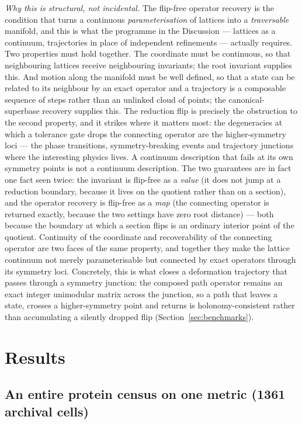 \documentclass[11pt]{article}
\begin{document}
\emph{Why this is structural, not incidental.} The flip-free operator recovery is
the condition that turns a continuous \emph{parameterisation} of lattices into a
\emph{traversable} manifold, and this is what the programme in the Discussion ---
lattices as a continuum, trajectories in place of independent refinements ---
actually requires. Two properties must hold together. The coordinate must be
continuous, so that neighbouring lattices receive neighbouring invariants; the
root invariant supplies this. And motion along the manifold must be well defined,
so that a state can be related to its neighbour by an exact operator and a
trajectory is a composable sequence of steps rather than an unlinked cloud of
points; the canonical-superbase recovery supplies this. The reduction flip is
precisely the obstruction to the second property, and it strikes where it matters
most: the degeneracies at which a tolerance gate drops the connecting operator are
the higher-symmetry loci --- the phase transitions, symmetry-breaking events and
trajectory junctions where the interesting physics lives. A continuum description
that fails at its own symmetry points is not a continuum description. The two
guarantees are in fact one fact seen twice: the invariant is flip-free as a
\emph{value} (it does not jump at a reduction boundary, because it lives on the
quotient rather than on a section), and the operator recovery is flip-free as a
\emph{map} (the connecting operator is returned exactly, because the two settings
have zero root distance) --- both because the boundary at which a section flips is
an ordinary interior point of the quotient. Continuity of the coordinate and
recoverability of the connecting operator are two faces of the same property, and
together they make the lattice continuum not merely parameterisable but connected
by exact operators through its symmetry loci. Concretely, this is what closes a
deformation trajectory that passes through a symmetry junction: the composed
path operator remains an exact integer unimodular matrix across the junction, so a
path that leaves a state, crosses a higher-symmetry point and returns is
holonomy-consistent rather than accumulating a silently dropped flip
(Section~\ref{sec:benchmarks}).

\section{Results}

\subsection{An entire protein census on one metric (1361 archival cells)}
\end{document}
